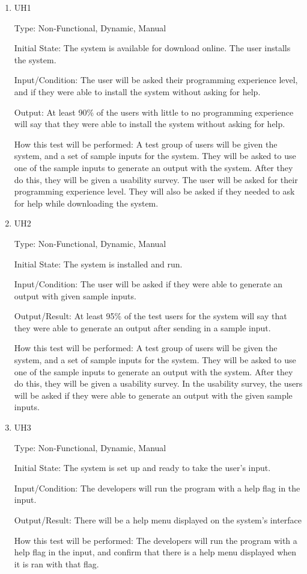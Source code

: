\documentclass[12pt, titlepage]{article}
\begin{document}
\begin{enumerate}

\item{UH1\\}\label{UH1}

Type: Non-Functional, Dynamic, Manual
					
Initial State: 
The system is available for download online. The user installs the system.

Input/Condition: 
The user will be asked their programming experience level, and if they were able to install the system without asking for help.	

Output: 
At least 90\% of the users with little to no programming experience will say that they were able to install the system without asking for help.

How this test will be performed: 
A test group of users will be given the system, and a set of sample inputs for the system. They will be asked to use one of the sample inputs to generate an output with the system. After they do this, they will be given a usability survey. The user will be asked for their programming experience level. They will also be asked if they needed to ask for help while downloading the system.
\\
\item{UH2\\}\label{UH2}

Type: Non-Functional, Dynamic, Manual
					
Initial State: 
The system is installed and run.

Input/Condition: 
The user will be asked if they were able to generate an output with given sample inputs.

Output/Result: 
At least 95\% of the test users for the system will say that they were able to generate an output after sending in a sample input.
					
How this test will be performed:
A test group of users will be given the system, and a set of sample inputs for the system. They will be asked to use one of the sample inputs to generate an output with the system. After they do this, they will be given a usability survey. In the usability survey, the users will be asked if they were able to generate an output with the given sample inputs.
\\
\item{UH3\\}\label{UH3}

Type: Non-Functional, Dynamic, Manual
					
Initial State: The system is set up and ready to take the user's input.

Input/Condition: The developers will run the program with a help flag in the input.
			
Output/Result: 
There will be a help menu displayed on the system's interface

How this test will be performed:
The developers will run the program with a help flag in the input, and confirm that there is a help menu displayed when it is ran with that flag.

\end{enumerate}
\end{document}
